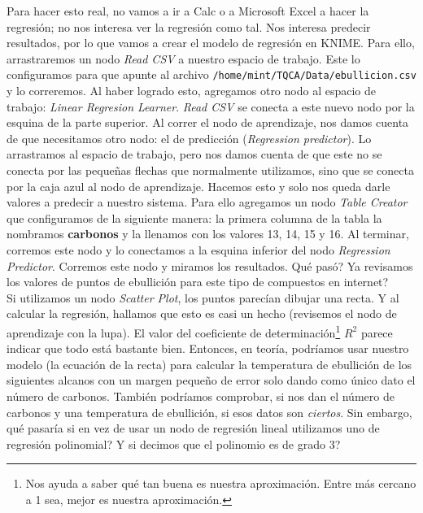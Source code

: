 \documentclass[10pt,letterpaper]{article}
\newcommand{\inlinecode}[1]{
\colorbox{light-gray}{\texttt{#1}}
}
\begin{document}
Para hacer esto real, no vamos a ir a Calc o a Microsoft Excel a hacer la regresi\'on; no nos interesa ver la regresi\'on como tal. Nos interesa predecir resultados, por lo que vamos a crear el modelo de regresi\'on en KNIME. Para ello, arrastraremos un nodo \textit{Read CSV} a nuestro espacio de trabajo. Este lo configuramos para que apunte al archivo \inlinecode{/home/mint/TQCA/Data/ebullicion.csv} y lo correremos. Al haber logrado esto, agregamos otro nodo al espacio de trabajo: \textit{Linear Regresion Learner}. \textit{Read CSV} se conecta a este nuevo nodo por la esquina de la parte superior. Al correr el nodo de aprendizaje, nos damos cuenta de que necesitamos otro nodo: el de predicci\'on (\textit{Regression predictor}). Lo arrastramos al espacio de trabajo, pero nos damos cuenta de que este no se conecta por las peque\~nas flechas que normalmente utilizamos, sino que se conecta por la caja azul al nodo de aprendizaje. Hacemos esto y solo nos queda darle valores a predecir a nuestro sistema. Para ello agregamos un nodo \textit{Table Creator} que configuramos de la siguiente manera: la primera columna de la tabla la nombramos \textbf{carbonos} y la llenamos con los valores 13, 14, 15 y 16. Al terminar, corremos este nodo y lo conectamos a la esquina inferior del nodo \textit{Regression Predictor}. Corremos este nodo y miramos los resultados. Qu\'e pas\'o? Ya revisamos los valores de puntos de ebullici\'on para este tipo de compuestos en internet?\\

Si utilizamos un nodo \textit{Scatter Plot}, los puntos parec\'ian dibujar una recta. Y al calcular la regresi\'on, hallamos que esto es casi un hecho (revisemos el nodo de aprendizaje con la lupa). El valor del coeficiente de determinaci\'on\footnote{Nos ayuda a saber qu\'e tan buena es nuestra aproximaci\'on. Entre m\'as cercano a 1 sea, mejor es nuestra aproximaci\'on.} $R^2$ parece indicar que todo est\'a bastante bien. Entonces, en teor\'ia, podr\'iamos usar nuestro modelo (la ecuaci\'on de la recta) para calcular la temperatura de ebullici\'on de los siguientes alcanos con un margen peque\~no de error solo dando como \'unico dato el n\'umero de carbonos. Tambi\'en podr\'iamos comprobar, si nos dan el n\'umero de carbonos y una temperatura de ebullici\'on, si esos datos son \textit{ciertos}. Sin embargo, qu\'e pasar\'ia si en vez de usar un nodo de regresi\'on lineal utilizamos uno de regresi\'on polinomial? Y si decimos que el polinomio es de grado 3?\\
\end{document}
